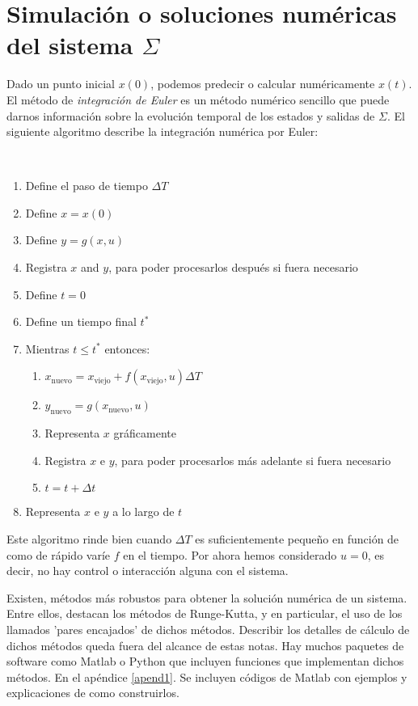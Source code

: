 \section{Simulación o soluciones numéricas del sistema $\Sigma$}
Dado un punto inicial $x(0)$, podemos predecir o calcular numéricamente $x(t)$. El método de \emph{integración de Euler} es un método numérico sencillo que puede darnos información sobre la evolución temporal de los estados y salidas de $\Sigma$. El siguiente algoritmo describe la integración numérica por Euler:
\begin{algo}   \ \\
	\begin{enumerate}
		\item Define el paso de tiempo $\Delta T$
		\item Define $x = x(0)$
		\item Define $y = g(x,u)$
		\item Registra $x$ and $y$, para poder procesarlos después si fuera necesario
		\item Define $t = 0$
		\item Define un tiempo final $t^*$
		\item Mientras $t \leq t^*$ entonces:
			\begin{enumerate}
				\item $x_{\text{nuevo}} = x_{\text{viejo}} + f(x_{\text{viejo}},u)\Delta T$
				\item $y_{\text{nuevo}} = g(x_{\text{nuevo}},u)$
				\item Representa $x$ gráficamente
				\item Registra $x$ e $y$, para poder procesarlos más adelante si fuera necesario
				\item $t = t + \Delta t$
			\end{enumerate}
		\item Representa $x$ e $y$ a lo largo de $t$
	\end{enumerate}
\end{algo}

Este algoritmo rinde bien cuando $\Delta T$ es suficientemente pequeño en función de como de rápido varíe $f$ en el tiempo. Por ahora hemos considerado $u=0$, es decir, no hay control o interacción alguna con el sistema.

Existen, métodos más robustos para obtener la solución numérica de un sistema. Entre ellos, destacan los métodos de Runge-Kutta, y en particular, el uso de los llamados 'pares encajados' de dichos métodos. Describir los detalles de cálculo de dichos métodos queda fuera del alcance de estas notas. Hay muchos paquetes de software como Matlab o Python que incluyen funciones que implementan dichos métodos. En  el apéndice \ref{apend1}. Se incluyen códigos de Matlab con ejemplos y explicaciones de como construirlos.

